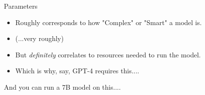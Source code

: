 \documentclass{beamer}
\begin{document}
\begin{frame}{Parameters}
	\begin{itemize}
		\item Roughly corresponds to how "Complex" or "Smart" a model is.
		\pause
		\item (...very roughly)
		\pause 
		\item But \textit{definitely} correlates to resources needed to run the model.
		\pause
		\item Which is why, say, GPT-4 requires this....
	\end{itemize}
\end{frame}



\begin{frame}[plain]
\end{frame}

\begin{frame}
	And you can run a 7B model on this....
\end{frame}

\begin{frame}[plain]
\end{frame}
\end{document}

